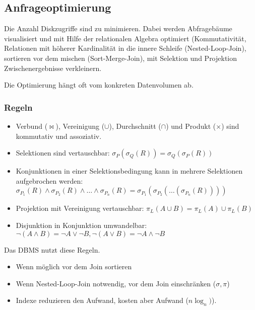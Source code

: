 \subsection{Anfrageoptimierung}
Die Anzahl Diskzugriffe sind zu minimieren. Dabei werden Abfragebäume visualisiert und mit Hilfe der relationalen Algebra
optimiert (Kommutativität, Relationen mit höherer Kardinalität in die innere Schleife (Nested-Loop-Join), sortieren vor
dem mischen (Sort-Merge-Join), mit Selektion und Projektion Zwischenergebnisse verkleinern.

Die Optimierung hängt oft vom konkreten Datenvolumen ab.

\subsubsection{Regeln}
\begin{itemize}
	\item Verbund ($\Join$), Vereinigung ($\cup$), Durchschnitt ($\cap$) und Produkt ($\times$) 
	sind kommutativ und assoziativ. 
	\item Selektionen sind vertauschbar: $\sigma_P(\sigma_Q(R)) = \sigma_Q(\sigma_P(R))$
	\item Konjunktionen in einer Selektionsbedingung kann in mehrere Selektionen aufgebrochen werden:
	$\sigma_{P_1}(R) \wedge \sigma_{P_2}(R) \wedge \dots \wedge \sigma_{P_n}(R) = \sigma_{P_1}(\sigma_{P_2}(\dots(\sigma_{P_n}(R))))$
	\item Projektion mit Vereinigung vertauschbar: $\pi_L(A \cup B) = \pi_L(A) \cup \pi_L(B)$
	\item Disjunktion in Konjunktion umwandelbar: $\neg (A \wedge B) = \neg A \vee \neg B, \neg (A \vee B) = \neg A \wedge \neg B$
\end{itemize}
Das DBMS nutzt diese Regeln.
\begin{itemize}\itemsep0em
	\item Wenn möglich vor dem Join sortieren
	\item Wenn Nested-Loop-Join notwendig, vor dem Join einschränken ($\sigma, \pi$)
	\item Indexe reduzieren den Aufwand, kosten aber Aufwand ($n \log_n)$).
\end{itemize}

